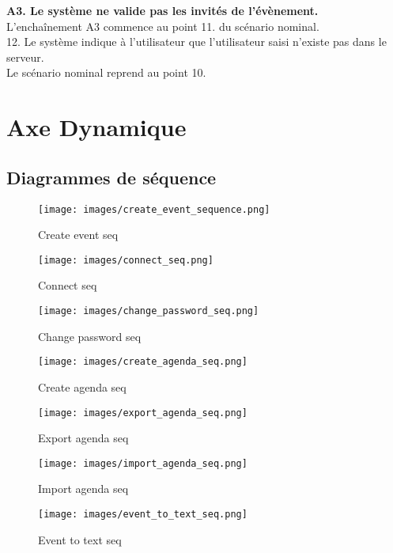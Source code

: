 \documentclass{article}
\begin{document}
\textbf{A3. Le système ne valide pas les invités de l'évènement.}\\
L'enchaînement A3 commence au point 11. du scénario nominal.\\
12. Le système indique à l'utilisateur que l'utilisateur saisi n'existe pas dans le serveur.\\
Le scénario nominal reprend au point 10.\\

\newpage
\section{Axe Dynamique}
\subsection{Diagrammes de séquence}

\begin{figure}[H]
    \centering
    \texttt{[image: images/create\_event\_sequence.png]}
    \caption{Create event seq}
    \label{fig:2}
\end{figure}

\begin{figure}[H]
    \centering
    \texttt{[image: images/connect\_seq.png]}
    \caption{Connect seq}
    \label{fig:3}
\end{figure}

\begin{figure}[H]
    \centering
    \texttt{[image: images/change\_password\_seq.png]}
    \caption{Change password seq}
    \label{fig:4}
\end{figure}

\begin{figure}[H]
    \centering
    \texttt{[image: images/create\_agenda\_seq.png]}
    \caption{Create agenda seq}
    \label{fig:5}
\end{figure}

\begin{figure}[H]
    \centering
    \texttt{[image: images/export\_agenda\_seq.png]}
    \caption{Export agenda seq}
    \label{fig:6}
\end{figure}

\begin{figure}[H]
    \centering
    \texttt{[image: images/import\_agenda\_seq.png]}
    \caption{Import agenda seq}
    \label{fig:7}
\end{figure}

\begin{figure}[H]
    \centering
    \texttt{[image: images/event\_to\_text\_seq.png]}
    \caption{Event to text seq}
    \label{fig:8}
\end{figure}
\end{document}
